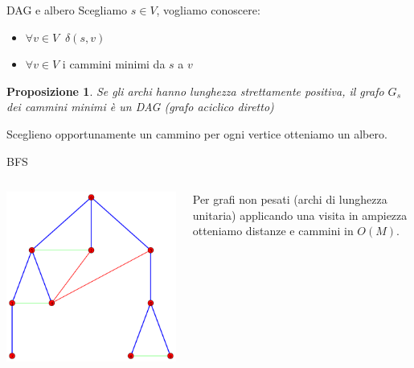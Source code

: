 \documentclass{beamer}
\newcounter{counter1}
\theoremstyle{plain}
\newtheorem{mypro}[counter1]{Proposizione}
\theoremstyle{definition}
\theoremstyle{remark}
\newcommand{\pa}[1]{\left(#1\right)}
\begin{document}
\begin{frame}{DAG e albero}
  Scegliamo $s\in V$, vogliamo conoscere:
  \begin{itemize}
  \item $\forall v\in V\;\; \delta \pa{s,v}$
  \item $\forall v\in V$ i cammini minimi da $s$ a $v$
  \end{itemize}

  \begin{mypro}
    Se gli archi hanno lunghezza strettamente positiva, il grafo $G_s$
    dei cammini minimi \`e un DAG (grafo aciclico diretto)
  \end{mypro}
  Sceglieno opportunamente un cammino per ogni vertice otteniamo un
  albero.
\end{frame}

\begin{frame}{BFS}
    \begin{columns}
    \begin{column}{0.40\textwidth}
      \includegraphics[width=\textwidth]{BFS}
    \end{column}
    \begin{column}{0.58\textwidth}
      Per grafi non pesati (archi di lunghezza unitaria) applicando
      una visita in ampiezza otteniamo distanze e cammini in
      $O\pa{M}$.
    \end{column}
  \end{columns}
\end{frame}
\end{document}
